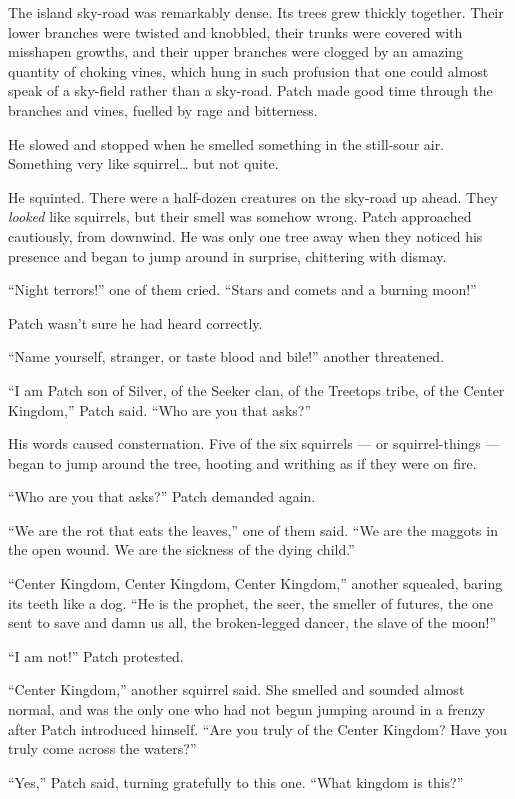 \documentclass[ebook,oneside,openany,17pt]{memoir}
\begin{document}
The island sky-road was remarkably dense. Its trees grew thickly
together. Their lower branches were twisted and knobbled, their trunks
were covered with misshapen growths, and their upper branches were
clogged by an amazing quantity of choking vines, which hung in such
profusion that one could almost speak of a sky-field rather than a
sky-road. Patch made good time through the branches and vines, fuelled
by rage and bitterness.

He slowed and stopped when he smelled something in the still-sour
air. Something very like squirrel… but not quite.

He squinted. There were a half-dozen creatures on the sky-road up
ahead. They \emph{looked} like squirrels, but their smell was
somehow wrong. Patch approached cautiously, from downwind. He was only
one tree away when they noticed his presence and began to jump around
in surprise, chittering with dismay.

“Night terrors!” one of them cried. “Stars and comets and a burning
moon!”

Patch wasn’t sure he had heard correctly.

“Name yourself, stranger, or taste blood and bile!” another
threatened.

“I am Patch son of Silver, of the Seeker clan, of the Treetops tribe,
of the Center Kingdom,” Patch said. “Who are you that asks?”

His words caused consternation. Five of the six squirrels — or
squirrel-things — began to jump around the tree, hooting and writhing
as if they were on fire.

“Who are you that asks?” Patch demanded again.

“We are the rot that eats the leaves,” one of them said. “We are the
maggots in the open wound. We are the sickness of the dying child.”

“Center Kingdom, Center Kingdom, Center Kingdom,” another squealed,
baring its teeth like a dog. “He is the prophet, the seer, the smeller
of futures, the one sent to save and damn us all, the broken-legged
dancer, the slave of the moon!”

“I am not!” Patch protested.

“Center Kingdom,” another squirrel said. She smelled and sounded
almost normal, and was the only one who had not begun jumping around
in a frenzy after Patch introduced himself. “Are you truly of the
Center Kingdom? Have you truly come across the waters?”

“Yes,” Patch said, turning gratefully to this one. “What kingdom is
this?”
\end{document}
